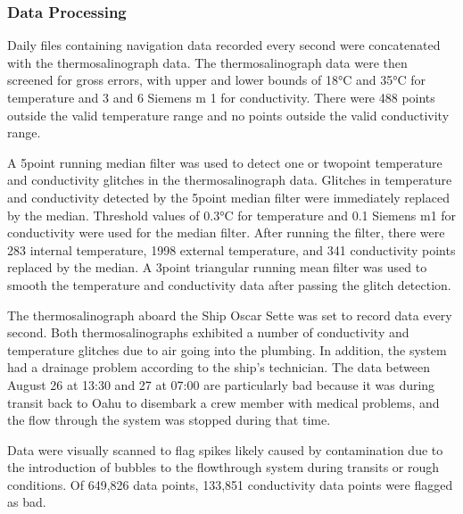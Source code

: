 \documentclass[a4paper,10pt,english,openany,oneside]{sphinxmanual}
\begin{document}
\subsubsection{Data Processing}
\label{\detokenize{4_section:id9}}
\sphinxAtStartPar
Daily files containing navigation data recorded every second were concatenated
with the thermosalinograph data. The thermosalinograph data were then screened
for gross errors, with upper and lower bounds of 18°C and 35°C for
temperature and 3 and 6 Siemens m \sphinxhyphen{}1 for conductivity. There were 488 points
outside the valid temperature range and no points outside the valid
conductivity range.

\sphinxAtStartPar
A 5\sphinxhyphen{}point running median filter was used to detect one\sphinxhyphen{} or two\sphinxhyphen{}point
temperature and conductivity glitches in the thermosalinograph data. Glitches
in temperature and conductivity detected by the 5\sphinxhyphen{}point median filter were
immediately replaced by the median. Threshold values of 0.3°C for temperature
and 0.1 Siemens m\sphinxhyphen{}1 for conductivity were used for the median filter. After
running the filter, there were 283 internal temperature, 1998 external
temperature, and 341 conductivity points replaced by the median. A 3\sphinxhyphen{}point
triangular running mean filter was used to smooth the temperature and
conductivity data after passing the glitch detection.

\sphinxAtStartPar
The thermosalinograph aboard the Ship Oscar Sette was set to record data every
second. Both thermosalinographs exhibited a number of conductivity and
temperature glitches due to air going into the plumbing. In addition, the
system had a drainage problem according to the ship’s technician. The data
between August 26 at 13:30 and 27 at 07:00 are particularly bad because it was
during transit back to Oahu to disembark a crew member with medical problems,
and the flow through the system was stopped during that time.

\sphinxAtStartPar
Data were visually scanned to flag spikes likely caused by contamination due to
the introduction of bubbles to the flow\sphinxhyphen{}through system during transits or rough
conditions. Of 649,826 data points, 133,851 conductivity data points were
flagged as bad.
\end{document}
